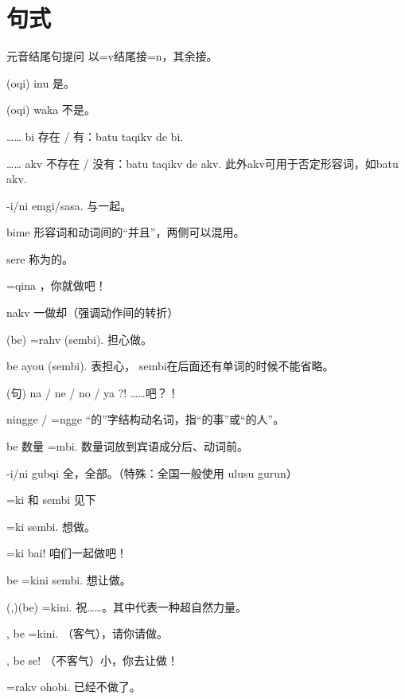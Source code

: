 \pagebreak

\section{句式}

\begin{des}
    \item[元音结尾句提问] 以=v结尾接=n，其余接。
    \item[\A (oqi) \B inu] 是。
    \item[\A (oqi) \B waka] 不是。
    \item[…… bi] 存在 / 有：batu taqikv de bi.
    \item[…… akv] 不存在 / 没有：batu taqikv de akv. 此外akv可用于否定形容词，如batu    akv.
    \item[\A \B -i/ni emgi/sasa.] \A 与\B 一起。
    \item[\lat{adj./v.} bime \lat{adj./v.}]  形容词和动词间的“并且”，两侧可以混用。
    \item[\A sere \B ] 称为\A 的\B 。
    \item[\A \V =qina] \A ，你就做\V 吧！
    \item[\V\ftn{命} nakv] 一做\V 却（强调动作间的转折）
    \item[\A \B (be) \V =rahv (sembi).] \A 担心\B 做\V 。 
    \item[\A \B be \V \ftn{结句} ayou (sembi).] 表担心， sembi在后面还有单词的时候不能省略。
    \item[(句) na / ne / no / ya ?!] ……吧？！ 
    \item[\V\ftn{形} ningge / \V\ftn{形}\!=ngge ] “的”字结构动名词，指“\V 的事”或“\V 的人”。
    \item[\A \B be 数量 \V =mbi.]数量词放到宾语成分后、动词前。 
    \item[\A -i/ni gubqi] 全\A ，全部\A 。（特殊：全国一般使用 ulusu gurun） 
    \item[=ki 和 sembi] 见下
    \begin{des}
        \item[\A \V =ki sembi.] \A 想做\V 。
        \item[\V =ki bai!] 咱们一起做\V 吧！ 
        \item[\A \B be \V =kini sembi.] \A 想让\V 做\V 。 
        \item[(\A ,)(\B be) \V =kini.] 祝\B ……。其中\A 代表一种超自然力量。
        \item[\A , \B be \V =kini.] （客气）\A ，请你请\B 做\V 。
        \item[\A , \B be \V \ftn{命} se!] （不客气）小\A ，你去让\B 做\V ！
    \end{des}
    \item[\V =rakv ohobi.] 已经不做\V 了。
\end{des}

